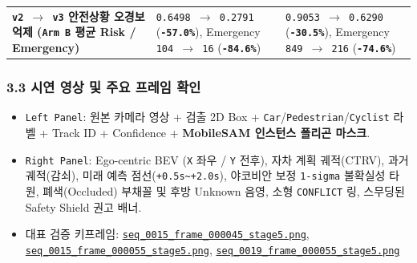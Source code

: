 \documentclass[10.5pt,a4paper]{article}
\begin{document}
\begin{footnotesize}
\begin{longtable}{>{\raggedright\arraybackslash}p{} >{\raggedright\arraybackslash}p{} >{\raggedright\arraybackslash}p{}}
\textbf{\texttt{v2 $\rightarrow$ v3} 안전상황 오경보 억제 (\texttt{Arm B} 평균 Risk / Emergency)} & \texttt{0.\allowbreak{}6498 $\rightarrow$ 0.\allowbreak{}2791} (\textbf{\texttt{-\allowbreak{}57.\allowbreak{}0\%}}), Emergency \texttt{104 $\rightarrow$ 16} (\textbf{\texttt{-\allowbreak{}84.\allowbreak{}6\%}}) & \texttt{0.\allowbreak{}9053 $\rightarrow$ 0.\allowbreak{}6290} (\textbf{\texttt{-\allowbreak{}30.\allowbreak{}5\%}}), Emergency \texttt{849 $\rightarrow$ 216} (\textbf{\texttt{-\allowbreak{}74.\allowbreak{}6\%}}) \\
\end{longtable}
\end{footnotesize}


\subsubsection{3.3 시연 영상 및 주요 프레임 확인}
\begin{itemize}[leftmargin=1.5em,itemsep=2pt]
\item \texttt{Left Panel}: 원본 카메라 영상 + 검출 2D Box + \texttt{Car}/\texttt{Pedestrian}/\texttt{Cyclist} 라벨 + Track ID + Confidence + \textbf{MobileSAM 인스턴스 폴리곤 마스크}.
\item \texttt{Right Panel}: Ego-centric BEV (\texttt{X} 좌우 / \texttt{Y} 전후), 자차 계획 궤적(CTRV), 과거 궤적(감쇠), 미래 예측 점선(\texttt{+0.\allowbreak{}5s\textasciitilde{}+2.\allowbreak{}0s}), 야코비안 보정 \texttt{1-\allowbreak{}sigma} 불확실성 타원, 폐색(Occluded) 부채꼴 및 후방 Unknown 음영, 소형 \texttt{CONFLICT} 링, 스무딩된 Safety Shield 권고 배너.
\item 대표 검증 키프레임: \href{https://github.com/Heisnotanimposter/Totalcare\_autonomous\_driving\_Yolov5/blob/main/results/v3\_bev\_fixed/world\_outputs/world\_model\_0015\_staged/keyframes/seq\_0015\_frame\_000045\_stage5.png}{\texttt{seq\_\allowbreak{}0015\_\allowbreak{}frame\_\allowbreak{}000045\_\allowbreak{}stage5.\allowbreak{}png}}, \href{https://github.com/Heisnotanimposter/Totalcare\_autonomous\_driving\_Yolov5/blob/main/results/v3\_bev\_fixed/world\_outputs/world\_model\_0015\_staged/keyframes/seq\_0015\_frame\_000055\_stage5.png}{\texttt{seq\_\allowbreak{}0015\_\allowbreak{}frame\_\allowbreak{}000055\_\allowbreak{}stage5.\allowbreak{}png}}, \href{https://github.com/Heisnotanimposter/Totalcare\_autonomous\_driving\_Yolov5/blob/main/results/v3\_bev\_fixed/world\_outputs/world\_model\_0019\_staged/keyframes/seq\_0019\_frame\_000055\_stage5.png}{\texttt{seq\_\allowbreak{}0019\_\allowbreak{}frame\_\allowbreak{}000055\_\allowbreak{}stage5.\allowbreak{}png}}
\end{itemize}
\end{document}
